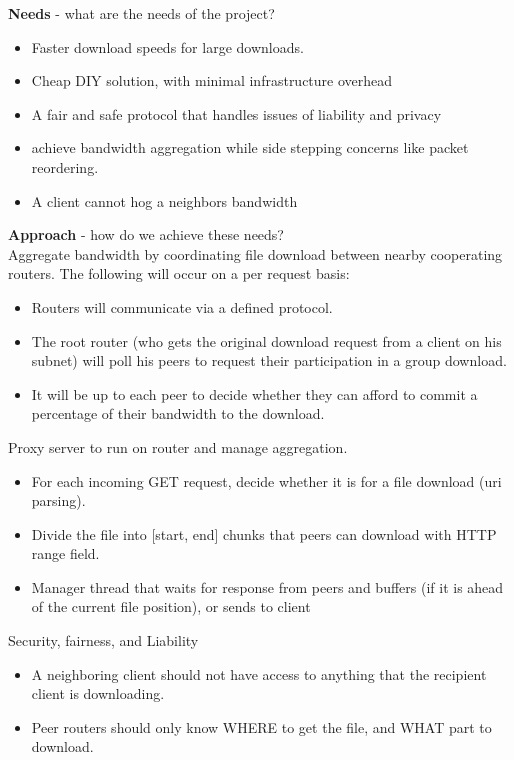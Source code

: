 \documentclass[12pt]{article}
\begin{document}
{\begin{description}
	\end{description}
	{\bf Needs} - what are the needs of the project?\\
		\begin{itemize}
			\item Faster download speeds for large downloads.
			\item Cheap DIY solution, with minimal infrastructure overhead
			\item A fair and safe protocol that handles issues of liability and privacy
			\item achieve bandwidth aggregation while side stepping concerns like packet reordering.
			\item A client cannot hog a neighbors bandwidth
		\end{itemize}
	{\bf Approach} - how do we achieve these needs?\\
		Aggregate bandwidth by coordinating file download between nearby cooperating routers. The following will occur on a per request basis:
		\begin{itemize}
			\item Routers will communicate via a defined protocol.
			\item The root router (who gets the original download request from a client on his subnet) will poll his peers to request their participation in a group download.
			\item It will be up to each peer to decide whether they can afford to commit a percentage of their bandwidth to the download.
		\end{itemize}
		Proxy server to run on router and manage aggregation. 
		\begin{itemize}
			\item For each incoming GET request, decide whether it is for a file download (uri parsing). 
			\item Divide the file into [start, end] chunks that peers can download with HTTP range field.
			\item Manager thread that waits for response from peers and buffers (if it is ahead of the current file position), or sends to client
		\end{itemize}
		Security, fairness, and Liability
		\begin{itemize}
			\item A neighboring client should not have access to anything that the recipient client is downloading.
			\item Peer routers should only know WHERE to get the file, and WHAT part to download.

\end{itemize}}
\end{document}
